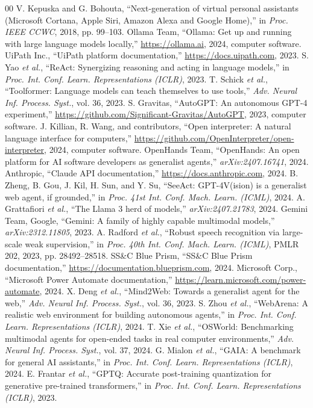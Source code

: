 \documentclass[conference]{IEEEtran}
\begin{document}
\begin{thebibliography}{00}
\footnotesize
\setlength{\itemsep}{0pt}
 V. Kepuska and G. Bohouta, ``Next-generation of virtual personal assistants (Microsoft Cortana, Apple Siri, Amazon Alexa and Google Home),'' in \emph{Proc. IEEE CCWC}, 2018, pp. 99--103.
 Ollama Team, ``Ollama: Get up and running with large language models locally,'' \url{https://ollama.ai}, 2024, computer software.
 UiPath Inc., ``UiPath platform documentation,'' \url{https://docs.uipath.com}, 2023.
 S. Yao \emph{et al.}, ``ReAct: Synergizing reasoning and acting in language models,'' in \emph{Proc. Int. Conf. Learn. Representations (ICLR)}, 2023.
 T. Schick \emph{et al.}, ``Toolformer: Language models can teach themselves to use tools,'' \emph{Adv. Neural Inf. Process. Syst.}, vol. 36, 2023.
 S. Gravitas, ``AutoGPT: An autonomous GPT-4 experiment,'' \url{https://github.com/Significant-Gravitas/AutoGPT}, 2023, computer software.
 J. Killian, R. Wang, and contributors, ``Open interpreter: A natural language interface for computers,'' \url{https://github.com/OpenInterpreter/open-interpreter}, 2024, computer software.
 OpenHands Team, ``OpenHands: An open platform for AI software developers as generalist agents,'' \emph{arXiv:2407.16741}, 2024.
 Anthropic, ``Claude API documentation,'' \url{https://docs.anthropic.com}, 2024.
 B. Zheng, B. Gou, J. Kil, H. Sun, and Y. Su, ``SeeAct: GPT-4V(ision) is a generalist web agent, if grounded,'' in \emph{Proc. 41st Int. Conf. Mach. Learn. (ICML)}, 2024.
 A. Grattafiori \emph{et al.}, ``The Llama 3 herd of models,'' \emph{arXiv:2407.21783}, 2024.
 Gemini Team, Google, ``Gemini: A family of highly capable multimodal models,'' \emph{arXiv:2312.11805}, 2023.
 A. Radford \emph{et al.}, ``Robust speech recognition via large-scale weak supervision,'' in \emph{Proc. 40th Int. Conf. Mach. Learn. (ICML)}, PMLR 202, 2023, pp. 28492--28518.
 SS\&C Blue Prism, ``SS\&C Blue Prism documentation,'' \url{https://documentation.blueprism.com}, 2024.
 Microsoft Corp., ``Microsoft Power Automate documentation,'' \url{https://learn.microsoft.com/power-automate}, 2024.
 X. Deng \emph{et al.}, ``Mind2Web: Towards a generalist agent for the web,'' \emph{Adv. Neural Inf. Process. Syst.}, vol. 36, 2023.
 S. Zhou \emph{et al.}, ``WebArena: A realistic web environment for building autonomous agents,'' in \emph{Proc. Int. Conf. Learn. Representations (ICLR)}, 2024.
 T. Xie \emph{et al.}, ``OSWorld: Benchmarking multimodal agents for open-ended tasks in real computer environments,'' \emph{Adv. Neural Inf. Process. Syst.}, vol. 37, 2024.
 G. Mialon \emph{et al.}, ``GAIA: A benchmark for general AI assistants,'' in \emph{Proc. Int. Conf. Learn. Representations (ICLR)}, 2024.
 E. Frantar \emph{et al.}, ``GPTQ: Accurate post-training quantization for generative pre-trained transformers,'' in \emph{Proc. Int. Conf. Learn. Representations (ICLR)}, 2023.
\end{thebibliography}
\end{document}
